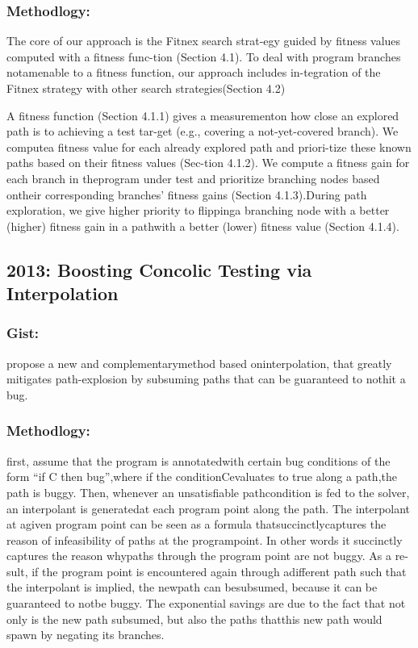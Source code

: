 \documentclass[	runningheads,
				a4paper]{llncs}
\begin{document}
\subsubsection{Methodlogy:}
The core of our approach is the Fitnex search strat-egy guided by fitness values computed with a fitness func-tion (Section 4.1).  To deal with program branches notamenable to a fitness function, our approach includes in-tegration of the Fitnex strategy with other search strategies(Section 4.2)

A fitness function (Section 4.1.1) gives a measurementon how close an explored path is to achieving a test tar-get (e.g., covering a not-yet-covered branch). We computea fitness value for each already explored path and priori-tize these known paths based on their fitness values (Sec-tion 4.1.2). We compute a fitness gain for each branch in theprogram under test and prioritize branching nodes based ontheir corresponding branches’ fitness gains (Section 4.1.3).During path exploration, we give higher priority to flippinga branching node with a better (higher) fitness gain in a pathwith a better (lower) fitness value (Section 4.1.4).

\subsection{2013: Boosting Concolic Testing via Interpolation}
\subsubsection{Gist:}
propose  a  new  and  complementarymethod based oninterpolation, that greatly mitigates path-explosion by subsuming paths that can be guaranteed to nothit a bug.

\subsubsection{Methodlogy:}
first,  assume  that  the  program  is  annotatedwith  certain  bug  conditions  of  the  form “if C then bug”,where  if  the  conditionCevaluates  to  true  along  a  path,the  path  is  buggy.   Then,  whenever  an  unsatisfiable  pathcondition  is  fed  to  the  solver,  an  interpolant  is  generatedat each program point along the path.  The interpolant at agiven program point can be seen as a formula thatsuccinctlycaptures the reason of infeasibility of paths at the programpoint.  In other words it succinctly captures the reason whypaths through the program point are not buggy.  As a re-sult,  if  the  program  point  is  encountered  again  through  adifferent path such that the interpolant is implied, the newpath can besubsumed, because it can be guaranteed to notbe buggy. The exponential savings are due to the fact that not only is the new path subsumed, but also the paths thatthis new path would spawn by negating its branches.
\end{document}
